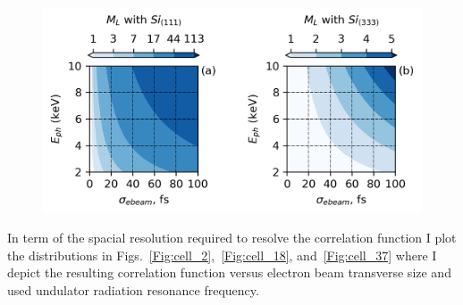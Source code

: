     \begin{figure}[h]
    	\centering
        \includegraphics[width=0.63\linewidth]{content/images/ebeam_size_with_SR/M_L.png}
        \captionsetup{justification=centering}
        \caption{}
        \label{Fig:M_L}
    \end{figure}

    In term of the spacial resolution required to resolve the correlation function I plot the distributions in Figs.~\ref{Fig:cell_2},~\ref{Fig:cell_18}, and~\ref{Fig:cell_37} where I depict the resulting correlation function versus electron beam transverse size and used undulator radiation  resonance frequency.
